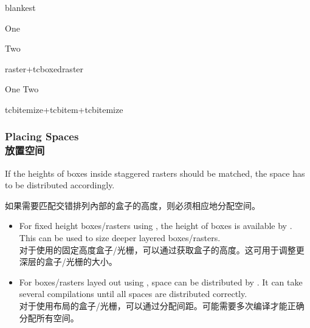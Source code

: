 \begin{dispExample}
\begin{tcbraster}[raster equal height=rows,
raster every box/.style={colframe=red!50!black,colback=red!10!white}]
\begin{tcboxedraster}[raster columns=1]{blankest}
\begin{tcolorbox}One\end{tcolorbox}
\begin{tcolorbox}Two\end{tcolorbox}
\end{tcboxedraster}
\begin{tcolorbox}raster+tcboxedraster\end{tcolorbox}
\end{tcbraster}
\end{dispExample}


\begin{dispExample}
\begin{tcbitemize}[raster equal height=rows,
raster every box/.style={colframe=red!50!black,colback=red!10!white}]
\tcbitem[blankest]
\begin{tcbitemize}[raster columns=1]
\tcbitem One
\tcbitem Two
\end{tcbitemize}
\tcbitem tcbitemize+tcbitem+tcbitemize
\end{tcbitemize}
\end{dispExample}


\subsubsection{Placing Spaces\\放置空间}
If the heights of boxes inside staggered rasters should be matched, the
space has to be distributed accordingly.

如果需要匹配交错排列內部的盒子的高度，则必须相应地分配空间。
\begin{itemize}
\item For fixed height boxes/rasters using ,
the height of boxes is available by . This can be
used to size deeper layered boxes/rasters.
\\对于使用的固定高度盒子/光栅，可以通过获取盒子的高度。这可用于调整更深层的盒子/光栅的大小。
\item For boxes/rasters layed out using ,
space can be distributed by .
It can take several compilations until all spaces are distributed correctly.
\\对于使用布局的盒子/光栅，可以通过分配间距。可能需要多次编译才能正确分配所有空间。
\end{itemize}



